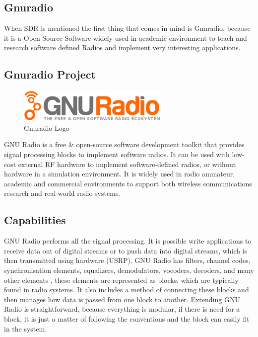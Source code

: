 \subsection{Gnuradio}

When SDR is mentioned the first thing that comes in mind is Gnuradio, because it
is a Open Source Software widely used in academic environment to teach and
research software defined Radios and implement very interesting applications.

\subsection{Gnuradio Project}

\begin{figure}[htbp]
    \centering
    \includegraphics[width=0.65\textwidth]{./figures/gnuradio}
    \caption{ Gnuradio Logo
    \label{fig:gnuradiologo}}
\end{figure}

GNU Radio is a free \& open-source software development toolkit that provides
signal processing blocks to implement software radios. It can be used with
low-cost external RF hardware to implement software-defined radios, or without
hardware in a simulation environment. It is widely used in radio ammateur,
academic and commercial environments to support both wireless communications
research and real-world radio systems.

\subsection{Capabilities}

GNU Radio performs all the signal processing. It is possible write applications
to receive data out of digital streams or to push data into digital streams,
which is then transmitted using hardware (USRP). GNU Radio has filters, channel
codes, synchronisation elements, equalizers, demodulators, vocoders, decoders,
and many other elements , these elements are represented as blocks, which are
typically found in radio systems. It also includes a method of connecting these
blocks and then manages how data is passed from one block to another. Extending
GNU Radio is straightforward, because everything is modular, if there is need
for a block, it is just a matter of following the conventions and the block can
easily fit in the system.\\


